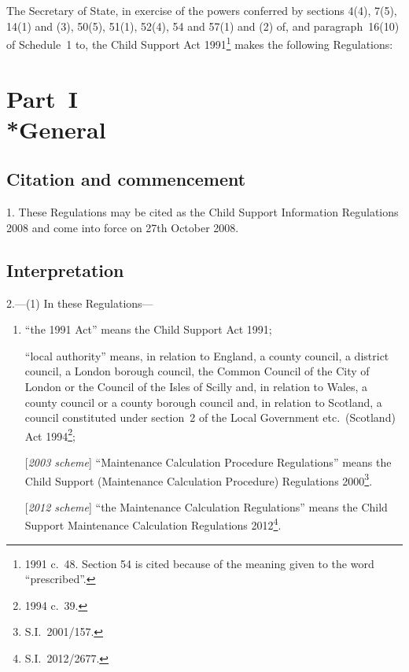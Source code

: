 \documentclass[12pt,a4paper]{article}
\title{\regstitle}
\author{S.I.\ 2008 No.\ 2551}
\date{Made
26th September 2008\\
Laid before Parliament
2nd October 2008\\
Coming into force
27th October 2008
}
\begin{document}
\maketitle

\noindent
The Secretary of State, in exercise of the powers conferred by sections 4(4), 7(5), 14(1) and (3), 50(5), 51(1), 52(4), 54 and 57(1) and (2) of, and paragraph~16(10) of Schedule~1 to, the Child Support Act 1991\footnote{1991 c.~48. Section 54 is cited because of the meaning given to the word “prescribed”.} makes the following Regulations: 

{\sloppy

\tableofcontents

}

\bigskip

\setcounter{secnumdepth}{-2}

\section[Part~I --- General]{Part~I\\*General}

\renewcommand\parthead{--- Part~I}

\subsection[1. Citation and commencement]{Citation and commencement}

1.  These Regulations may be cited as the Child Support Information Regulations 2008 and come into force on 27th October 2008.

\bigskip

\subsection[2. Interpretation]{Interpretation}

2.---(1)  In these Regulations—
\begin{enumerate}\item[]
“the 1991 Act” means the Child Support Act 1991;

“local authority” means, in relation to England, a county council, a district council, a London borough council, the Common Council of the City of London or the Council of the Isles of Scilly and, in relation to Wales, a county council or a county borough council and, in relation to Scotland, a council constituted under section~2 of the Local Government etc.\ (Scotland) Act 1994\footnote{1994 c.~39.};

\begin{sloppypar}
[\emph{2003 scheme}] “Maintenance Calculation Procedure Regulations” means the Child Support (Maintenance Calculation Procedure) Regulations 2000\footnote{S.I.~2001/157.}.
\end{sloppypar}

[\emph{2012 scheme}] “the Maintenance Calculation Regulations” means the Child Support Maintenance Calculation Regulations 2012\footnote{S.I.~2012/2677.}.
\end{enumerate}
\end{document}
